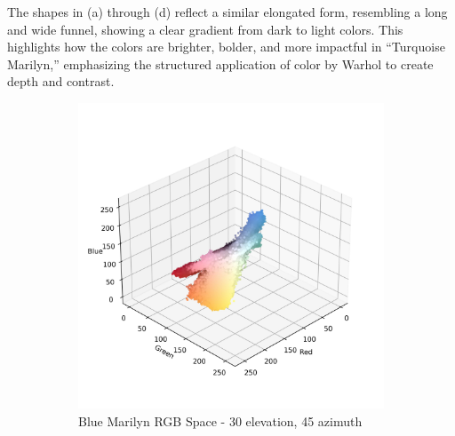 \documentclass{article}
\begin{document}
The shapes in (a) through (d) reflect a similar elongated form,
resembling a long and wide funnel, showing a clear gradient from dark to
light colors. This highlights how the colors are brighter, bolder, and
more impactful in ``Turquoise Marilyn,'' emphasizing the structured
application of color by Warhol to create depth and contrast.

\begin{figure}[ht]
  \centering
  \begin{subfigure}{0.45\textwidth}
    \includegraphics[width=\textwidth]{main_files/figure-latex/4_13_blue_marilyn_original_scatter.jpg}
    \caption{Blue Marilyn RGB Space - 30 \degree elevation, 45 \degree azimuth}
    \label{fig:4_13_blue_marilyn_original_scatter}
  \end{subfigure}
  \hfill
  \begin{subfigure}{0.45\textwidth}

\end{subfigure}
\end{figure}
\end{document}
